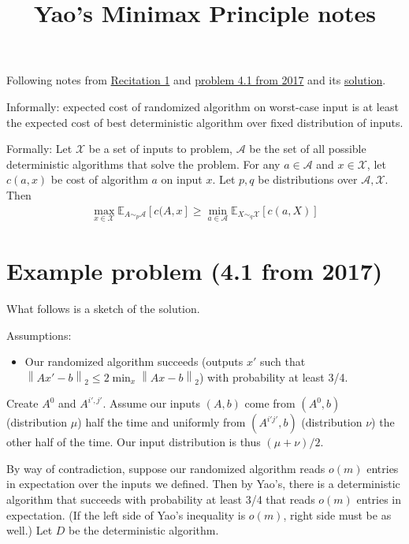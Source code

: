 \documentclass[11pt]{article}
\title{Yao's Minimax Principle notes}
\newcommand{\eq}[1]{\begin{align*}#1\end{align*}}
\newcommand{\link}[2]{{\color{blue}\href{#1}{#2}}}
\newcommand{\norm}[1]{\left\lVert#1\right\rVert}
\begin{document}
\maketitle

Following notes from \link{http://www.cs.cmu.edu/afs/cs/user/dwoodruf/www/teaching/15859-fall19/Recitation_1.pdf}{Recitation 1} and \link{http://www.cs.cmu.edu/afs/cs/user/dwoodruf/www/teaching/15859-fall17/ps1.pdf}{problem 4.1 from 2017} and its \link{http://www.cs.cmu.edu/afs/cs/user/dwoodruf/www/teaching/15859-fall17/ps1sol.pdf}{solution}.

Informally: expected cost of randomized algorithm on worst-case input is at least the expected cost of best deterministic algorithm over fixed distribution of inputs.

Formally: Let $\mathcal{X}$ be a set of inputs to problem, $\mathcal{A}$ be the set of all possible deterministic algorithms that solve the problem. For any $a \in \mathcal{A}$ and $x \in \mathcal{X}$, let $c(a,x)$ be cost of algorithm $a$ on input $x$. Let $p,q$ be distributions over $\mathcal{A},\mathcal{X}$. Then
\eq{
\max_{x \in \mathcal{X}} \mathbb{E}_{A\sim_p\mathcal{A}}[c(A,x] \geq
\min_{a \in \mathcal{A}} \mathbb{E}_{X\sim_q \mathcal{X}}[c(a,X)]
}

\section{Example problem (4.1 from 2017)}

What follows is a sketch of the solution.

Assumptions:

\begin{itemize}
\item Our randomized algorithm succeeds (outputs $x'$ such that $\norm{Ax'-b}_2 \leq 2 \min_x \norm{Ax-b}_2$) with probability at least 3/4.
\end{itemize}

Create $A^0$ and $A^{i',j'}$. Assume our inputs $(A, b)$ come from $(A^0, b)$ (distribution $\mu$) half the time and uniformly from $(A^{i'j'},b)$ (distribution $\nu$) the other half of the time. Our input distribution is thus $(\mu + \nu)/2$.

By way of contradiction, suppose our randomized algorithm reads $o(m)$ entries in expectation over the inputs we defined. Then by Yao's, there is a deterministic algorithm that succeeds with probability at least 3/4 that reads $o(m)$ entries in expectation. (If the left side of Yao's inequality is $o(m)$, right side must be as well.) Let $D$ be the deterministic algorithm.
\end{document}
